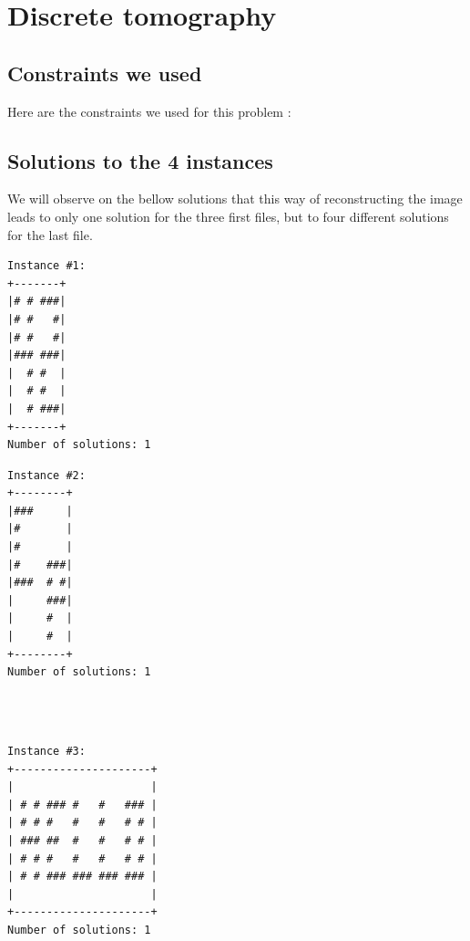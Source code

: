 \documentclass[a4paper ,12pt,french]{article}
\begin{document}
\section{Discrete tomography}

\subsection{Constraints we used}

Here are the constraints we used for this problem :


\subsection{Solutions to the 4 instances}


We will observe on the bellow solutions that this way of reconstructing the image leads to only one solution for the three first files, but to four different solutions for the last file.\\

\begin{minipage}[l]{.5\textwidth} 
 \begin{verbatim}
Instance #1:
+-------+
|# # ###|
|# #   #|
|# #   #|
|### ###|
|  # #  |
|  # #  |
|  # ###|
+-------+
Number of solutions: 1
\end{verbatim}
\end{minipage}\hfill 
\begin{minipage}[r]{.5\textwidth} 
\begin{verbatim}
Instance #2:
+--------+
|###     |
|#       |
|#       |
|#    ###|
|###  # #|
|     ###|
|     #  |
|     #  |
+--------+
Number of solutions: 1
\end{verbatim}
\end{minipage}

\ \\
\ \\

\begin{minipage}[l]{.5\textwidth} 
 \begin{verbatim}
Instance #3:
+---------------------+
|                     |
| # # ### #   #   ### |
| # # #   #   #   # # |
| ### ##  #   #   # # |
| # # #   #   #   # # |
| # # ### ### ### ### |
|                     |
+---------------------+
Number of solutions: 1
\end{verbatim}
\end{minipage}\hfill 
\begin{minipage}[r]{.5\textwidth} 

\end{minipage}
\end{document}
